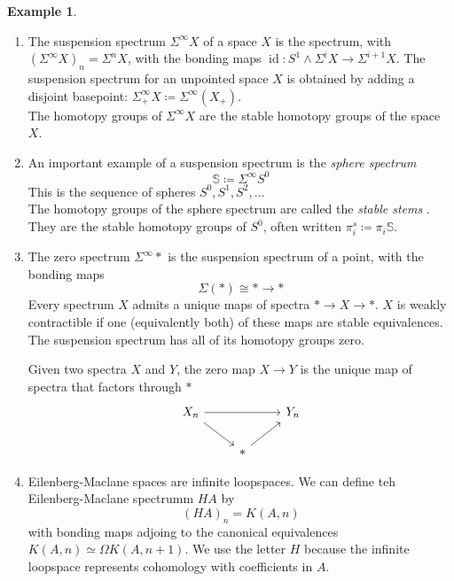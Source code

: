 \documentclass[notitlepage,12pt]{article}
\theoremstyle{definition}
\newtheorem{example}[theorem]{Example}
\theoremstyle{para}{\normalfont}
\begin{document}
\begin{example}
    \begin{enumerate}
    \item The suspension spectrum $\Sigma^{\infty } X$ of a space $X$ is the spectrum, with $(\Sigma^{\infty } X)_n=\Sigma^nX$, with the bonding maps $\operatorname*{id }:S^1\wedge \Sigma^iX\to \Sigma^{i+1 } X$. The suspension spectrum for an unpointed space $X$ is obtained by adding a disjoint basepoint: $\Sigma^{\infty } _+X\coloneqq \Sigma^{\infty } (X_+)$. \\
    The homotopy groups of $\Sigma^{\infty } X$ are the stable homotopy groups of the space $X$. 
        \item An important example of a suspension spectrum is the \textit{sphere spectrum} $$\mathbb{S}\coloneqq \Sigma^{\infty } S^0$$ This is the sequence of spheres $S^0,S^1,S^2,\dots$ \\
        The homotopy groups of the sphere spectrum are called the \textit{stable stems }. They are the stable homotopy groups of $S^0$, often written $\pi_i^s\coloneqq \pi_i \mathbb{S}$.
    \item \label{2}The zero spectrum $\Sigma^{\infty}*$ is the suspension spectrum of a point, with the bonding maps 
    \[
        \Sigma(*)\cong * \to *
    \] 
    Every spectrum $X$ admits a unique maps of spectra $*\to X\to *$. $X$ is weakly contractible if one (equivalently both) of these maps are stable equivalences. \\
    The suspension spectrum has all of its homotopy groups zero. 

    Given two spectra $X$ and $Y$, the zero map $X\to Y$ is the unique map of spectra that factors through $*$
    \[
        \begin{tikzcd}
X_n \arrow[rd] \arrow[rr] &              & Y_n \\
                          & * \arrow[ru] &    
\end{tikzcd}
    \]
    
    \item\label{3} Eilenberg-Maclane spaces are infinite loopspaces. We can define teh Eilenberg-Maclane spectrumm $HA$ by 
    \[
        (HA)_n=K(A,n)
    \] with bonding maps adjoing to the canonical equivalences $K(A,n)\simeq \Omega K(A,n+1)$. We use the letter $H$ because the infinite loopspace represents cohomology with coefficients in $A$. 


\end{enumerate}
\end{example}
\end{document}
